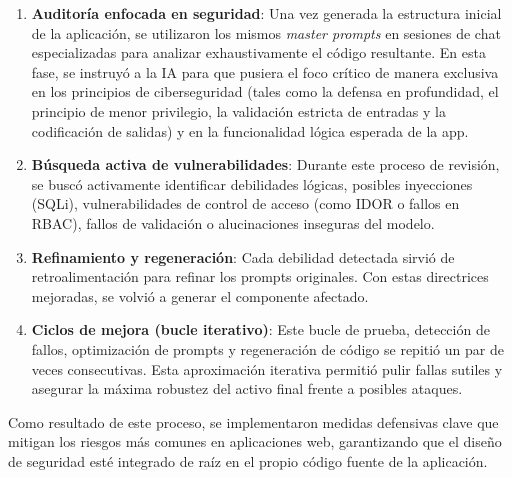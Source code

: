 \begin{enumerate}
    \item \textbf{Auditoría enfocada en seguridad}: Una vez generada la estructura inicial de la aplicación, se utilizaron los mismos \textit{master prompts} en sesiones de chat especializadas para analizar exhaustivamente el código resultante. En esta fase, se instruyó a la IA para que pusiera el foco crítico de manera exclusiva en los principios de ciberseguridad (tales como la defensa en profundidad, el principio de menor privilegio, la validación estricta de entradas y la codificación de salidas) y en la funcionalidad lógica esperada de la app.
    
    \item \textbf{Búsqueda activa de vulnerabilidades}: Durante este proceso de revisión, se buscó activamente identificar debilidades lógicas, posibles inyecciones (SQLi), vulnerabilidades de control de acceso (como IDOR o fallos en RBAC), fallos de validación o alucinaciones inseguras del modelo.
    
    \item \textbf{Refinamiento y regeneración}: Cada debilidad detectada sirvió de retroalimentación para refinar los prompts originales. Con estas directrices mejoradas, se volvió a generar el componente afectado.
    
    \item \textbf{Ciclos de mejora (bucle iterativo)}: Este bucle de prueba, detección de fallos, optimización de prompts y regeneración de código se repitió un par de veces consecutivas. Esta aproximación iterativa permitió pulir fallas sutiles y asegurar la máxima robustez del activo final frente a posibles ataques.
\end{enumerate}

Como resultado de este proceso, se implementaron medidas defensivas clave que mitigan los riesgos más comunes en aplicaciones web, garantizando que el diseño de seguridad esté integrado de raíz en el propio código fuente de la aplicación.
